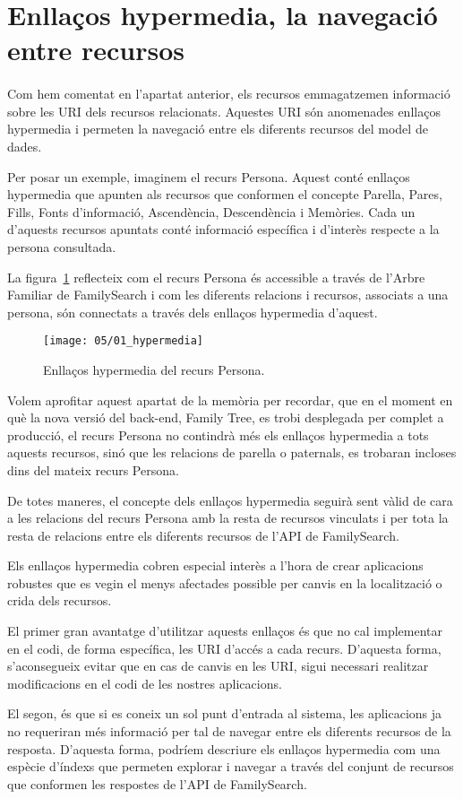\section{Enllaços hypermedia, la navegació entre recursos}

    \paragraph{}
    Com hem comentat en l’apartat anterior, els recursos emmagatzemen informació sobre les URI dels recursos relacionats. Aquestes URI són anomenades enllaços hypermedia i permeten la navegació  entre els diferents recursos del model de dades.

    Per posar un exemple, imaginem el recurs Persona. Aquest conté enllaços hypermedia que apunten als recursos que conformen el concepte Parella, Pares, Fills, Fonts d'informació, Ascendència, Descendència i Memòries. Cada un d'aquests recursos apuntats conté informació específica i d'interès respecte a la persona consultada.

    La figura~\ref{fig:hypermedia} reflecteix com el recurs Persona és accessible a través de l'Arbre Familiar de FamilySearch i com les diferents relacions i recursos, associats a una persona, són connectats a través dels enllaços hypermedia d'aquest.

    \begin{figure}[h]
        \texttt{[image: 05/01\_hypermedia]}
        \centering
        \caption{Enllaços hypermedia del recurs Persona.}\label{fig:hypermedia}
    \end{figure}

    Volem aprofitar aquest apartat de la memòria per recordar, que en el moment en què la nova versió del back-end, Family Tree, es trobi desplegada per complet a producció, el recurs Persona no contindrà més els enllaços hypermedia a tots aquests recursos, sinó que les relacions de parella o paternals, es trobaran incloses dins del mateix recurs Persona.

    De totes maneres, el concepte dels enllaços hypermedia seguirà sent vàlid de cara a les relacions del recurs Persona amb la resta de recursos vinculats i per tota la resta de relacions entre els diferents recursos de l'API de FamilySearch.

    Els enllaços hypermedia cobren especial interès a l'hora de crear aplicacions robustes que es vegin el menys afectades possible per canvis en la localització o crida dels recursos.

    El primer gran avantatge d’utilitzar aquests enllaços és que no cal implementar en el codi, de forma específica, les URI d'accés a cada recurs. D'aquesta forma, s'aconsegueix evitar que en cas de canvis en les URI, sigui necessari realitzar modificacions en el codi de les nostres aplicacions.

    El segon, és que si es coneix un sol punt d’entrada al sistema, les aplicacions ja no requeriran més informació per tal de navegar entre els diferents recursos de la resposta. D'aquesta forma, podríem descriure els enllaços hypermedia com una espècie d'índexs que permeten explorar i navegar a través del conjunt de recursos que conformen les respostes de l'API de FamilySearch. 
